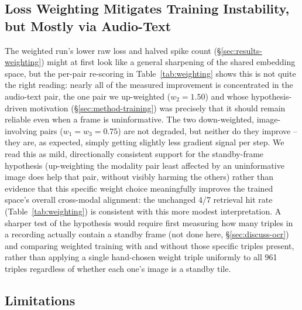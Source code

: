 ﻿\documentclass[twocolumn]{article}
\begin{document}
\subsection{Loss Weighting Mitigates Training Instability, but Mostly via Audio-Text}
\label{sec:discuss-weighting}

The weighted run's lower raw loss and halved spike count (\S\ref{sec:results-weighting}) might at
first look like a general sharpening of the shared embedding space, but the per-pair re-scoring in
Table~\ref{tab:weighting} shows this is not quite the right reading: nearly all of the measured
improvement is concentrated in the audio-text pair, the one pair we up-weighted ($w_2=1.50$) and
whose hypothesis-driven motivation (\S\ref{sec:method-training}) was precisely that it should remain
reliable even when a frame is uninformative. The two down-weighted, image-involving pairs
($w_1=w_3=0.75$) are not degraded, but neither do they improve -- they are, as expected, simply
getting slightly less gradient signal per step. We read this as mild, directionally consistent
support for the standby-frame hypothesis (up-weighting the modality pair least affected by an
uninformative image does help that pair, without visibly harming the others) rather than evidence
that this specific weight choice meaningfully improves the trained space's overall cross-modal
alignment: the unchanged 4/7 retrieval hit rate (Table~\ref{tab:weighting}) is consistent with this
more modest interpretation. A sharper test of the hypothesis would require first measuring how many
triples in a recording actually contain a standby frame (not done here, \S\ref{sec:discuss-ocr}) and
comparing weighted training with and without those specific triples present, rather than applying a
single hand-chosen weight triple uniformly to all 961 triples regardless of whether each one's image
is a standby tile.

\subsection{Limitations}
\end{document}
